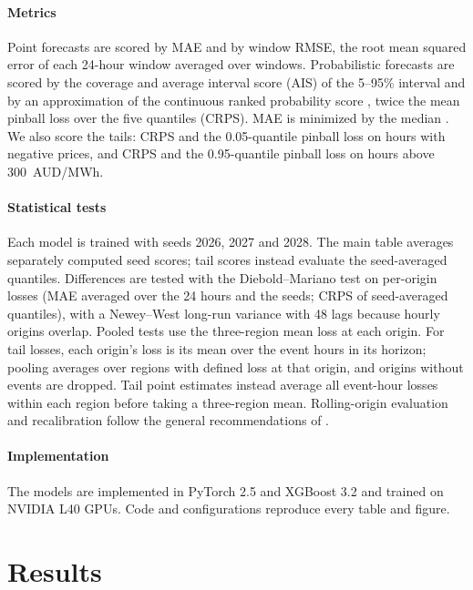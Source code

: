 \documentclass[preprint,12pt]{elsarticle}
\begin{document}
\paragraph{Metrics} Point forecasts are scored by MAE and by window RMSE, the root mean squared error of each 24-hour window averaged over windows. Probabilistic forecasts are scored by the coverage and average interval score (AIS) of the 5--95\% interval and by an approximation of the continuous ranked probability score \citep{gneiting2007strictly}, twice the mean pinball loss over the five quantiles (CRPS). MAE is minimized by the median \citep{gneiting2011making}. We also score the tails: CRPS and the 0.05-quantile pinball loss on hours with negative prices, and CRPS and the 0.95-quantile pinball loss on hours above 300~AUD/MWh.

\paragraph{Statistical tests} Each model is trained with seeds 2026, 2027 and 2028. The main table averages separately computed seed scores; tail scores instead evaluate the seed-averaged quantiles. Differences are tested with the Diebold--Mariano test \citep{diebold1995comparing} on per-origin losses (MAE averaged over the 24 hours and the seeds; CRPS of seed-averaged quantiles), with a Newey--West long-run variance \citep{newey1987simple} with 48 lags because hourly origins overlap. Pooled tests use the three-region mean loss at each origin. For tail losses, each origin's loss is its mean over the event hours in its horizon; pooling averages over regions with defined loss at that origin, and origins without events are dropped. Tail point estimates instead average all event-hour losses within each region before taking a three-region mean. Rolling-origin evaluation and recalibration follow the general recommendations of \citet{tashman2000out}.

\paragraph{Implementation} The models are implemented in PyTorch 2.5 and XGBoost 3.2 and trained on NVIDIA L40 GPUs. Code and configurations reproduce every table and figure.

\section{Results}
\label{sec:results}
\end{document}
